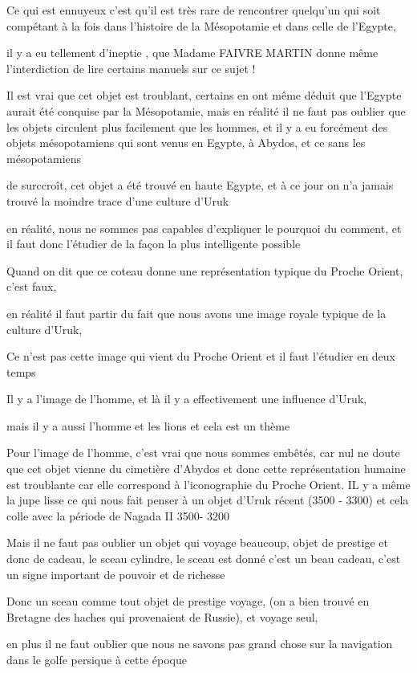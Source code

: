 \documentclass[a4paper,10pt]{article}
\begin{document}
Ce qui est ennuyeux c'est qu'il est
très rare de rencontrer quelqu'un qui soit compétant à
la fois dans l'histoire de la Mésopotamie et dans
celle de l'Egypte, 

il y a eu tellement d'ineptie , que Madame FAIVRE
MARTIN donne même l'interdiction de lire certains
manuels sur ce sujet !

Il est vrai que cet objet est troublant, certains en ont même déduit que
l'Egypte aurait été conquise par la Mésopotamie, mais
en réalité il ne faut pas oublier que les objets circulent plus
facilement que les hommes, et il y a eu forcément des objets
mésopotamiens qui sont venus en Egypte, à Abydos, et ce sans les
mésopotamiens

de surccroît, cet objet a été trouvé en haute Egypte, et à ce jour on
n'a jamais trouvé la moindre trace
d'une culture d'Uruk

en réalité, nous ne sommes pas capables d'expliquer le
pourquoi du comment, et il faut donc l'étudier de la
façon la plus intelligente possible

Quand on dit que ce coteau donne une représentation typique du Proche
Orient, c'est faux, 

en réalité il faut partir du fait que nous avons une image royale
typique de la culture d'Uruk, 

Ce n'est pas cette image qui vient du Proche Orient et
il faut l'étudier en deux temps

Il y a l'image de l'homme, et là il y
a effectivement une influence d'Uruk, 

mais il y a aussi l'homme et les lions et cela est un
thème

Pour l'image de l'homme,
c'est vrai que nous sommes embêtés, car nul ne doute
que cet objet vienne du cimetière d'Abydos et donc
cette représentation humaine est troublante car elle correspond à
l'iconographie du Proche Orient. IL y a même la jupe
lisse ce qui nous fait penser à un objet d'Uruk récent
(3500 - 3300) et cela colle avec la période de Nagada II 3500- 3200

Mais il ne faut pas oublier un objet qui voyage beaucoup, objet de
prestige et donc de cadeau, le sceau cylindre, le sceau est donné
c'est un beau cadeau, c'est un signe
important de pouvoir et de richesse

Donc un sceau comme tout objet de prestige voyage, (on a bien trouvé en
Bretagne des haches qui provenaient de Russie), et voyage seul, 

en plus il ne faut oublier que nous ne savons pas grand chose sur la
navigation dans le golfe persique à cette époque
\end{document}
